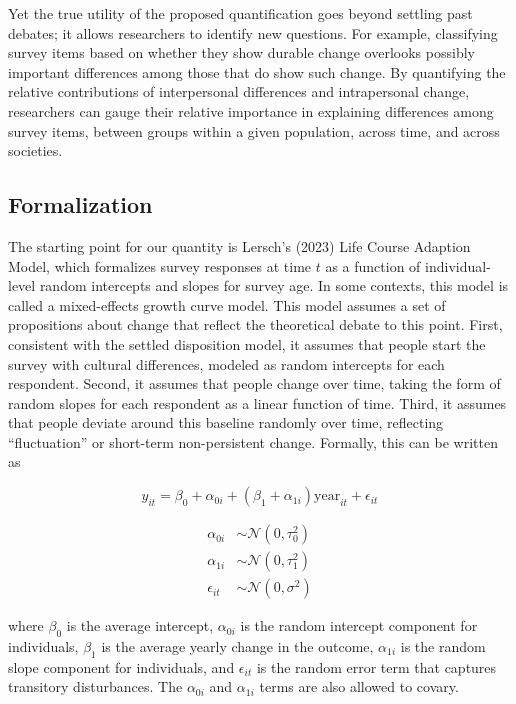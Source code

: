 \documentclass[
  11pt,
]{article}
\begin{document}
Yet the true utility of the proposed quantification goes beyond settling
past debates; it allows researchers to identify new questions. For
example, classifying survey items based on whether they show durable
change overlooks possibly important differences among those that do show
such change. By quantifying the relative contributions of interpersonal
differences and intrapersonal change, researchers can gauge their
relative importance in explaining differences among survey items,
between groups within a given population, across time, and across
societies.

\subsection{Formalization}\label{formalization}

The starting point for our quantity is Lersch's (2023) Life Course
Adaption Model, which formalizes survey responses at time \(t\) as a
function of individual-level random intercepts and slopes for survey
age. In some contexts, this model is called a mixed-effects growth curve
model. This model assumes a set of propositions about change that
reflect the theoretical debate to this point. First, consistent with the
settled disposition model, it assumes that people start the survey with
cultural differences, modeled as random intercepts for each respondent.
Second, it assumes that people change over time, taking the form of
random slopes for each respondent as a linear function of time. Third,
it assumes that people deviate around this baseline randomly over time,
reflecting ``fluctuation'' or short-term non-persistent change.
Formally, this can be written as

\[
y_{it} = \beta_0 + \alpha_{0i} + (\beta_1 + \alpha_{1i}) \text{year}_{it} + \epsilon_{it}
\]

\[
\begin{aligned}
\alpha_{0i} &\sim \mathcal{N}(0,\tau^2_{0}) \\
\alpha_{1i} &\sim \mathcal{N}(0,\tau^2_{1}) \\
\epsilon_{it} &\sim \mathcal{N}(0,\sigma^2)
\end{aligned}
\]

where \(\beta_0\) is the average intercept, \(\alpha_{0i}\) is the
random intercept component for individuals, \(\beta_1\) is the average
yearly change in the outcome, \(\alpha_{1i}\) is the random slope
component for individuals, and \(\epsilon_{it}\) is the random error
term that captures transitory disturbances. The \(\alpha_{0i}\) and
\(\alpha_{1i}\) terms are also allowed to covary.
\end{document}

